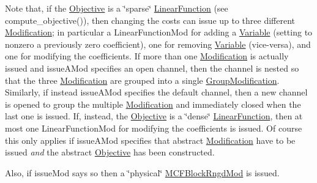 Note that, if the \mbox{\hyperlink{class_s_m_spp__di__unipi__it_1_1_objective}{Objective}} is a \char`\"{}sparse\char`\"{} \mbox{\hyperlink{class_s_m_spp__di__unipi__it_1_1_linear_function}{Linear\+Function}} (see compute\+\_\+objective()), then changing the costs can issue up to three different \mbox{\hyperlink{class_s_m_spp__di__unipi__it_1_1_modification}{Modification}}; in particular a Linear\+Function\+Mod for adding a \mbox{\hyperlink{class_s_m_spp__di__unipi__it_1_1_variable}{Variable}} (setting to nonzero a previously zero coefficient), one for removing \mbox{\hyperlink{class_s_m_spp__di__unipi__it_1_1_variable}{Variable}} (vice-\/versa), and one for modifying the coefficients. If more than one \mbox{\hyperlink{class_s_m_spp__di__unipi__it_1_1_modification}{Modification}} is actually issued and issue\+A\+Mod specifies an open channel, then the channel is nested so that the three \mbox{\hyperlink{class_s_m_spp__di__unipi__it_1_1_modification}{Modification}} are grouped into a single \mbox{\hyperlink{class_s_m_spp__di__unipi__it_1_1_group_modification}{Group\+Modification}}. Similarly, if instead issue\+A\+Mod specifies the default channel, then a new channel is opened to group the multiple \mbox{\hyperlink{class_s_m_spp__di__unipi__it_1_1_modification}{Modification}} and immediately closed when the last one is issued. If, instead, the \mbox{\hyperlink{class_s_m_spp__di__unipi__it_1_1_objective}{Objective}} is a \char`\"{}dense\char`\"{} \mbox{\hyperlink{class_s_m_spp__di__unipi__it_1_1_linear_function}{Linear\+Function}}, then at most one Linear\+Function\+Mod for modifying the coefficients is issued. Of course this only applies if issue\+A\+Mod specifies that abstract \mbox{\hyperlink{class_s_m_spp__di__unipi__it_1_1_modification}{Modification}} have to be issued {\itshape and} the abstract \mbox{\hyperlink{class_s_m_spp__di__unipi__it_1_1_objective}{Objective}} has been constructed.

Also, if issue\+Mod says so then a \char`\"{}physical\char`\"{} \mbox{\hyperlink{class_s_m_spp__di__unipi__it_1_1_m_c_f_block_rngd_mod}{M\+C\+F\+Block\+Rngd\+Mod}} is issued. \mbox{\label{class_s_m_spp__di__unipi__it_1_1_m_c_f_block_aa5e5b9ed0a813a3e09ef80fe0ee3920c}} 
